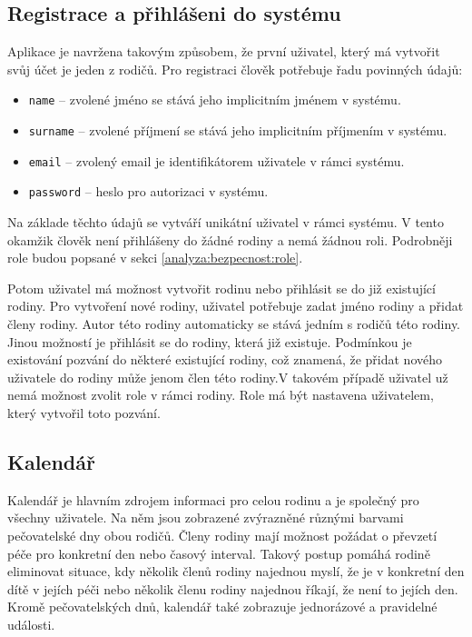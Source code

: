     \subsection{Registrace a přihlášeni do systému}
        Aplikace je navržena takovým způsobem, že první uživatel, který má vytvořit svůj účet je jeden z rodičů. Pro registraci člověk potřebuje řadu povinných údajů:
        \begin{itemize}
	        \item \texttt{name} -- zvolené jméno se stává jeho implicitním jménem v systému.
	        \item \texttt{surname} -- zvolené příjmení se stává jeho implicitním příjmením v systému.
	        \item \texttt{email} -- zvolený email je identifikátorem uživatele v rámci systému.
	        \item \texttt{password} -- heslo pro autorizaci v systému.
        \end{itemize}
        Na základe těchto údajů se vytváří unikátní uživatel v rámci systému. V tento okamžik člověk není přihlášeny do žádné rodiny a nemá žádnou roli. Podrobněji role budou popsané v sekci \ref{analyza:bezpecnost:role}.
        
        Potom uživatel má možnost vytvořit rodinu nebo přihlásit se do již existující rodiny. Pro vytvoření nové rodiny, uživatel potřebuje zadat jméno rodiny a přidat členy rodiny. Autor této rodiny automaticky se stává jedním s rodičů této rodiny. Jinou možností je přihlásit se do rodiny, která již existuje. Podmínkou je existování pozvání do některé existující rodiny, což znamená, že přidat nového uživatele do rodiny může jenom člen této rodiny.V takovém případě uživatel už nemá možnost zvolit role v rámci rodiny. Role má být nastavena uživatelem, který vytvořil toto pozvání.

    \subsection{Kalendář}    
        Kalendář je hlavním zdrojem informaci pro celou rodinu a je společný pro všechny uživatele. Na něm jsou zobrazené zvýrazněné různými barvami pečovatelské dny obou rodičů. Členy rodiny mají možnost požádat o převzetí péče pro konkretní den nebo časový interval. Takový postup pomáhá rodině eliminovat situace, kdy několik členů rodiny najednou myslí, že je v konkretní den dítě v jejích péči nebo několik členu rodiny najednou říkají, že není to jejích den. Kromě pečovatelských dnů, kalendář také zobrazuje jednorázové a pravidelné události.
        
